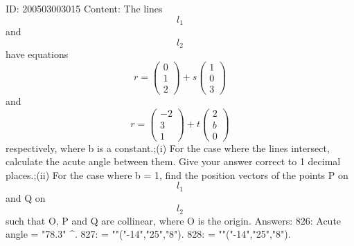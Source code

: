\documentclass{article}
\begin{document}
ID: 200503003015
Content:
The lines $$l_1$$ and $$l_2$$ have equations  $$r = \begin{pmatrix}0\\ 1\\ 2\end{pmatrix} + s\begin{pmatrix}1\\ 0\\ 3\end{pmatrix} $$ and $$r = \begin{pmatrix}-2\\ 3\\ 1\end{pmatrix} + t\begin{pmatrix}2\\ b\\ 0\end{pmatrix}$$ respectively, where b is a constant.;(i) For the case where the lines intersect, calculate the acute angle between them. Give your answer correct to 1 decimal places.;(ii) For the case where b = 1, find the position vectors of the points P on $$l_1$$ and Q on $$l_2$$ such that O, P and Q are collinear, where O is the origin. Answers:
826: Acute angle = "78.3" ^{\circ}.
827:  = ""("-14","25","8").
828:  = ""("-14","25","8").
\end{document}
